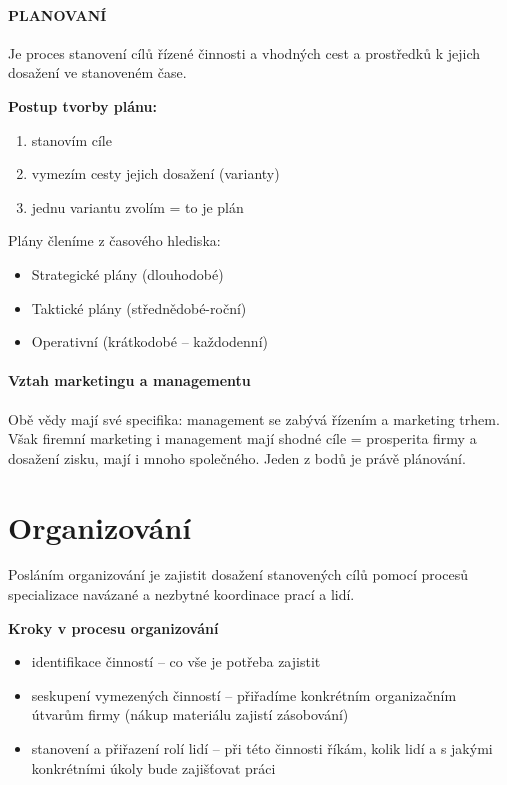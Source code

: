 \paragraph{PLANOVANÍ}
Je proces stanovení cílů řízené činnosti a vhodných cest a prostředků k jejich dosažení ve stanoveném čase.

\textbf{Postup tvorby plánu:}
\begin{enumerate}
    \item stanovím cíle
    \item vymezím cesty jejich dosažení (varianty)
    \item jednu variantu zvolím = to je plán    
\end{enumerate}

Plány členíme z časového hlediska:
\begin{itemize}
    \item Strategické plány (dlouhodobé)
    \item Taktické plány (střednědobé-roční)
    \item Operativní (krátkodobé -- každodenní)    
\end{itemize}

\paragraph{Vztah marketingu a managementu}
Obě vědy mají své specifika: management se zabývá řízením a marketing trhem. Však firemní marketing i management mají shodné cíle = prosperita firmy a dosažení zisku, mají i mnoho společného. Jeden z bodů je právě plánování.

\section*{Organizování}
Posláním organizování je zajistit dosažení stanovených cílů pomocí procesů specializace navázané a nezbytné koordinace prací a lidí.

\textbf{Kroky v procesu organizování}
\begin{itemize}
    \item identifikace činností -- co vše je potřeba zajistit
    \item seskupení vymezených činností -- přiřadíme konkrétním organizačním útvarům firmy (nákup materiálu zajistí zásobování)
    \item stanovení a přiřazení rolí lidí -- při této činnosti říkám, kolik lidí a s jakými konkrétními úkoly bude zajišťovat práci
\end{itemize}


